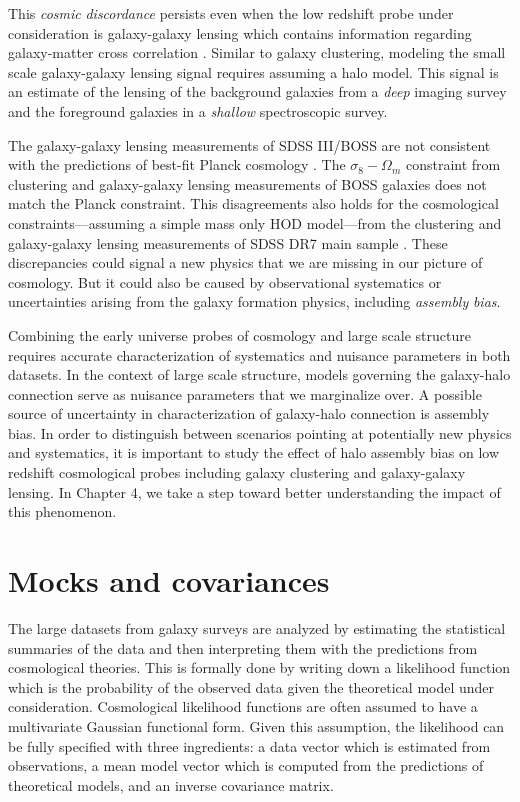 This \emph{cosmic} \emph{discordance} persists even when the low redshift probe under consideration is galaxy-galaxy lensing which contains information regarding galaxy-matter cross correlation \citep{mandel2013,more15,lensingislow}. Similar to galaxy clustering, modeling the small scale galaxy-galaxy lensing signal requires assuming a halo model. 
This signal is an estimate of the lensing of the background galaxies from a \emph{deep} imaging survey and the foreground galaxies in a \emph{shallow} spectroscopic survey.

The galaxy-galaxy lensing measurements of SDSS III/BOSS \citep{miyatake15,lensingislow} are not consistent with the predictions of best-fit Planck cosmology \citep{planckII}.
The $\sigma_{8}-\Omega_{m}$ constraint from clustering and galaxy-galaxy lensing measurements of BOSS galaxies \citep{more15} does not match the Planck constraint.
This disagreements also holds for the cosmological constraints---assuming a simple mass only HOD model---from the clustering and galaxy-galaxy lensing measurements of SDSS DR7 main sample \citep{cacciato13}. These discrepancies could signal a new physics that we are missing in our picture of cosmology. But it could also be caused by observational systematics or uncertainties arising from the galaxy formation physics, including \emph{assembly} \emph{bias}.

Combining the early universe probes of cosmology and large scale structure requires accurate 
characterization of systematics and nuisance parameters in both datasets. In the context of large scale 
structure, models governing the galaxy-halo connection serve as nuisance parameters that we marginalize over. A possible source of uncertainty in characterization of galaxy-halo connection is assembly bias. In order to distinguish between scenarios pointing at potentially new physics and systematics, it is important to study the effect of halo assembly bias on low redshift cosmological probes including galaxy clustering and galaxy-galaxy lensing. In Chapter 4, we take a step toward better understanding the impact of this phenomenon. 

\section{Mocks and covariances}

The large datasets from galaxy surveys are analyzed by estimating the statistical summaries of the 
data and then interpreting them with the predictions from cosmological theories. This is formally done 
by writing down a likelihood function which is the probability of the observed data given the theoretical model under 
consideration. Cosmological likelihood functions are often assumed to have a multivariate Gaussian 
functional form. Given this assumption, the likelihood can be fully specified with three ingredients: a data vector which is estimated from observations, a mean model vector 
which is computed from the predictions of theoretical models, and an inverse covariance matrix. 

